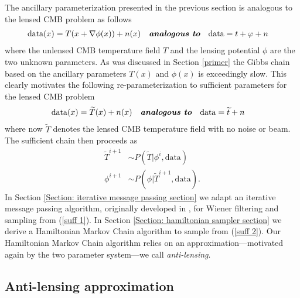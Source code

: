 \documentclass[noinfoline]{imsart}
\begin{document}
The ancillary parameterization presented in the previous section is analogous to the lensed CMB problem as follows
\begin{align*}
  \text{data}(x) &= T(x+\nabla \phi(x)) + n(x)\quad\text{\bf\em analogous to}\quad
  \text{data} =  t +\varphi + n
\end{align*}
where the unlensed  CMB temperature field $T$ and the lensing potential $\phi$ are the two unknown parameters. As was discussed in Section \ref{primer} the Gibbs chain based on the ancillary parameters $T(x)$ and $\phi(x)$ is exceedingly slow.  This clearly motivates the following re-parameterization to sufficient parameters for the lensed CMB problem 
\begin{align*}
  \text{data}(x) &= \widetilde T(x) + n(x) \quad\text{\bf\em analogous to}\quad
  \text{data} =  \widetilde t + n
\end{align*}
where now $\widetilde T$ denotes the lensed CMB temperature field with no noise or beam.
The sufficient chain then proceeds as
\begin{align}
\label{suff 1} \widetilde T^{i+1}&\sim P(\widetilde T |  \phi^{i},\text{data}) \\
\label{suff 2} \phi^{i+1}&\sim P(\phi | \widetilde T^{i+1},  \text{data}).
\end{align}
In Section \ref{Section: iterative message passing section} we adapt an iterative message passing algorithm, originally developed in \cite{elsner2013efficient,jasche2014matrix}, for Wiener filtering and sampling from (\ref{suff 1}). In Section \ref{Section: hamiltonian sampler section} we derive a Hamiltonian Markov Chain algorithm to sample from (\ref{suff 2}). Our Hamiltonian Markov Chain algorithm relies on an approximation---motivated again by the two parameter system---we call {\em anti-lensing}.







%
%
\subsection{Anti-lensing approximation}
\label{section: Anti-lensing approximation}
\end{document}
